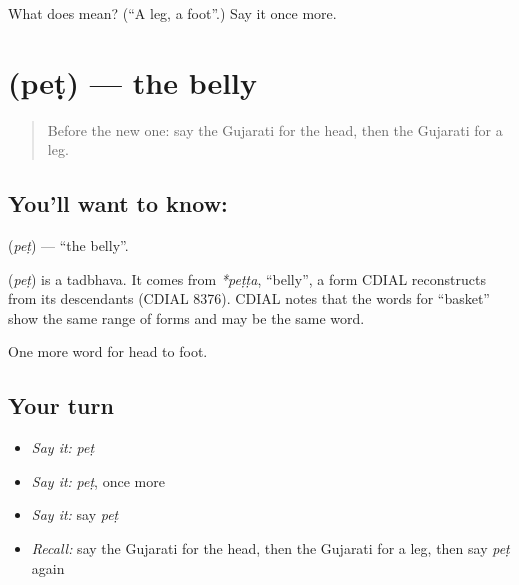 \begin{tcolorbox}[breakable,colback=teal!4,colframe=teal!35!black,title={Before you move on}]
What does  mean? (\textquotedblleft{}A leg, a foot\textquotedblright{}.) Say it once more.
\end{tcolorbox}
\section[\texorpdfstring{\gu{પેટ} (peṭ)}{પેટ (peṭ)}]{ (peṭ) — the belly}

\label{lesson:GU-C46-belly}



\begin{quote}
Before the new one: say the Gujarati for the head, then the Gujarati for a leg.
\end{quote}

\subsection*{You'll want to know: }
\textbf{} (\emph{peṭ}) — \textquotedblleft{}the belly\textquotedblright{}.

\begin{cousinweb}
\textbf{} (\emph{peṭ}) is a tadbhava. It comes from \emph{*peṭṭa}, \textquotedblleft{}belly\textquotedblright{}, a form CDIAL reconstructs from its descendants (CDIAL 8376). CDIAL notes that the words for \textquotedblleft{}basket\textquotedblright{} show the same range of forms and may be the same word.
\end{cousinweb}

\begin{grammarlens}[title={What you've built}]
One more word for head to foot.
\end{grammarlens}

\subsection*{Your turn}
\begin{itemize}
\raggedright
  \item \emph{Say it:} \emph{peṭ}
  \item \emph{Say it:} \emph{peṭ}, once more
  \item \emph{Say it:} say \emph{peṭ}
  \item \emph{Recall:} say the Gujarati for the head, then the Gujarati for a leg, then say \emph{peṭ} again
\end{itemize}

